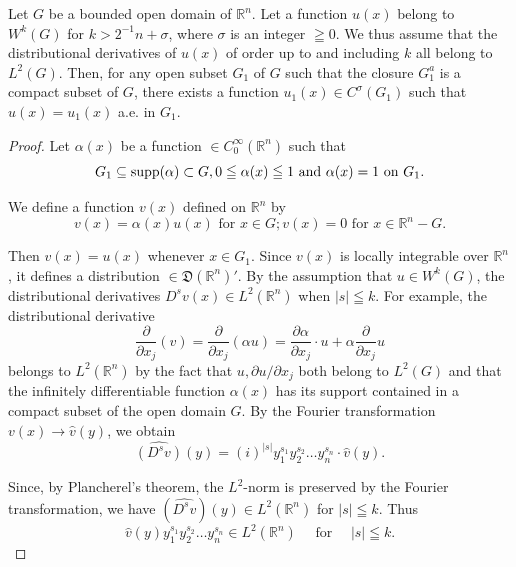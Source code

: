 \begin{theoremn}\label{thm:VI.7.Sobolev} Let $G$ be a bounded open domain of $\mathbb{R}^{n}$. Let a function $u(x)$ belong to $W^k(G)$ for $k > 2^{-1}n + \sigma$, where $\sigma$ is an integer $\geqq 0$. We thus assume that the distributional derivatives of $u(x)$ of order up to and including $k$ all belong to $L^2(G)$. Then, for any open subset $G_1$ of $G$ such that the closure $G_1^a$ is a compact subset of $G$, there exists a function $u_1(x) \in C^\sigma(G_1)$ such that $u(x) = u_1(x)$ a.e. in $G_1$.

\end{theoremn}
\begin{proof}
 Let $\alpha(x)$ be a function $\in C_0^\infty(\mathbb{R}^{n})$ such that 
\[
G _{1} \subseteq \operatorname{supp} (\alpha) \subset G, 0 \leqq \alpha (x) \leqq 1 \text{ and } \alpha (x) = 1 \text{ on } G _{1}. \]

We define a function $v(x)$ defined on $\mathbb{R}^{n}$ by 
\[
v (x) = \alpha (x) u (x) \text{ for } x \in G; v (x) = 0 \text{ for } x \in \mathbb{R}^{n} - G.
\]

Then $v(x) = u(x)$ whenever $x \in G_1$. Since $v(x)$ is locally integrable over $\mathbb{R}^{n}$, it defines a distribution $\in \mathfrak{D}(\mathbb{R}^{n})'$. By the assumption that $u \in W^k(G)$, the distributional derivatives $D^s v(x) \in L^2(\mathbb{R}^{n})$ when $|s| \leqq k$. For example, the distributional derivative 
\[
\frac {\partial}{\partial x _{j}} (v) = \frac {\partial}{\partial x _{j}} (\alpha u) = \frac {\partial \alpha}{\partial x _{j}} \cdot u + \alpha \frac {\partial}{\partial x _{j}} u
\]
belongs to $L^2(\mathbb{R}^{n})$ by the fact that $u, \partial u / \partial x_j$ both belong to $L^2(G)$ and that the infinitely differentiable function $\alpha(x)$ has its support contained in a compact subset of the open domain $G$. By the Fourier transformation $v(x) \to \hat{v}(y)$, we obtain 
\[
\widehat {(D ^{s} v)} (y) = (i) ^{|s|} y _{1} ^ {s _{1}} y _{2} ^ {s _{2}} \dots y _{n} ^ {s _{n}} \cdot \hat {v} (y).
\]

Since, by Plancherel's theorem, the $L^2$-norm is preserved by the Fourier transformation, we have $(\widehat{D^s v})(y) \in L^2(\mathbb{R}^{n})$ for $|s| \leqq k$. Thus 
\begin{equation}\label{eq:VI.7.1}
\hat {v} (y) y _{1} ^ {s _{1}} y _{2} ^ {s _{2}} \dots y _{n} ^ {s _{n}} \in L ^{2} (\mathbb{R}^{n}) \quad \text{ for } \quad | s | \leqq k.
\end{equation}


\end{proof}
